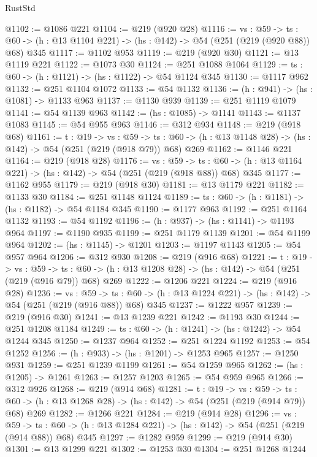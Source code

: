 \begin{lexlean}{RustStd}
\begin{coremodule}
@1102 := @1086 @221
@1104 := @219 (@920 @28)
@1116 := {vs : @59} ->
  {ts : @60} -> (h : @13 @1104 @221) -> (hs : @142) -> @54 (@251 (@219 (@920 @88)) @68) @345
@1117 := @1102 @953
@1119 := @219 (@920 @30)
@1121 := @13 @1119 @221
@1122 := @1073 @30
@1124 := @251 @1088 @1064
@1129 := {ts : @60} -> (h : @1121) -> (hs : @1122) -> @54 @1124 @345
@1130 := @1117 @962
@1132 := @251 @1104 @1072
@1133 := @54 @1132
@1136 := (h : @941) -> (hs : @1081) -> @1133 @963
@1137 := @1130 @939
@1139 := @251 @1119 @1079
@1141 := @54 @1139 @963
@1142 := (hs : @1085) -> @1141
@1143 := @1137 @1083
@1145 := @54 @955 @963
@1146 := @312 @934
@1148 := @219 (@918 @68)
@1161 := {t : @19} ->
  {vs : @59} ->
  {ts : @60} -> (h : @13 @1148 @28) -> (hs : @142) -> @54 (@251 (@219 (@918 @79)) @68) @269
@1162 := @1146 @221
@1164 := @219 (@918 @28)
@1176 := {vs : @59} ->
  {ts : @60} -> (h : @13 @1164 @221) -> (hs : @142) -> @54 (@251 (@219 (@918 @88)) @68) @345
@1177 := @1162 @955
@1179 := @219 (@918 @30)
@1181 := @13 @1179 @221
@1182 := @1133 @30
@1184 := @251 @1148 @1124
@1189 := {ts : @60} -> (h : @1181) -> (hs : @1182) -> @54 @1184 @345
@1190 := @1177 @963
@1192 := @251 @1164 @1132
@1193 := @54 @1192
@1196 := (h : @937) -> (hs : @1141) -> @1193 @964
@1197 := @1190 @935
@1199 := @251 @1179 @1139
@1201 := @54 @1199 @964
@1202 := (hs : @1145) -> @1201
@1203 := @1197 @1143
@1205 := @54 @957 @964
@1206 := @312 @930
@1208 := @219 (@916 @68)
@1221 := {t : @19} ->
  {vs : @59} ->
  {ts : @60} -> (h : @13 @1208 @28) -> (hs : @142) -> @54 (@251 (@219 (@916 @79)) @68) @269
@1222 := @1206 @221
@1224 := @219 (@916 @28)
@1236 := {vs : @59} ->
  {ts : @60} -> (h : @13 @1224 @221) -> (hs : @142) -> @54 (@251 (@219 (@916 @88)) @68) @345
@1237 := @1222 @957
@1239 := @219 (@916 @30)
@1241 := @13 @1239 @221
@1242 := @1193 @30
@1244 := @251 @1208 @1184
@1249 := {ts : @60} -> (h : @1241) -> (hs : @1242) -> @54 @1244 @345
@1250 := @1237 @964
@1252 := @251 @1224 @1192
@1253 := @54 @1252
@1256 := (h : @933) -> (hs : @1201) -> @1253 @965
@1257 := @1250 @931
@1259 := @251 @1239 @1199
@1261 := @54 @1259 @965
@1262 := (hs : @1205) -> @1261
@1263 := @1257 @1203
@1265 := @54 @959 @965
@1266 := @312 @926
@1268 := @219 (@914 @68)
@1281 := {t : @19} ->
  {vs : @59} ->
  {ts : @60} -> (h : @13 @1268 @28) -> (hs : @142) -> @54 (@251 (@219 (@914 @79)) @68) @269
@1282 := @1266 @221
@1284 := @219 (@914 @28)
@1296 := {vs : @59} ->
  {ts : @60} -> (h : @13 @1284 @221) -> (hs : @142) -> @54 (@251 (@219 (@914 @88)) @68) @345
@1297 := @1282 @959
@1299 := @219 (@914 @30)
@1301 := @13 @1299 @221
@1302 := @1253 @30
@1304 := @251 @1268 @1244

\end{coremodule}
\end{lexlean}
